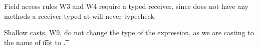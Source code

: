 \documentclass[a4paper,USenglish]{tex/lipics-v2016}
\begin{document}
Field access rules W3 and W4 require a typed receiver, since \any does not
have any methods a receiver typed at \any will never typecheck.

Shallow casts, W9, do not change the type of the expression, as we are casting
to the name of \t not to \t.  

~\\

\begin{mathpar}













\end{mathpar}
\end{document}
